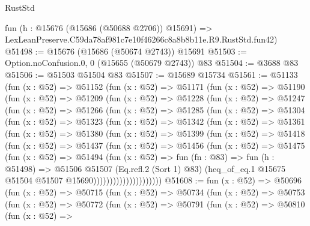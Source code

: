 \begin{lexlean}{RustStd}
\begin{coremodule}
    fun (h : @15676 (@15686 (@50688 @2706)) @15691) =>
    LexLeanPreserve.C59da78af981c7e10f46266c8a8b8b11e.R9.RustStd.fun42)
@51498 := @15676 (@15686 (@50674 @2743)) @15691
@51503 := Option.noConfusion.{0, 0} (@15655 (@50679 @2743)) @83
@51504 := @3688 @83
@51506 := @51503 @51504 @83
@51507 := @15689 @15734
@51561 := @51133
    (fun (x : @52) =>
    @51152
      (fun (x : @52) =>
      @51171
        (fun (x : @52) =>
        @51190
          (fun (x : @52) =>
          @51209
            (fun (x : @52) =>
            @51228
              (fun (x : @52) =>
              @51247
                (fun (x : @52) =>
                @51266
                  (fun (x : @52) =>
                  @51285
                    (fun (x : @52) =>
                    @51304
                      (fun (x : @52) =>
                      @51323
                        (fun (x : @52) =>
                        @51342
                          (fun (x : @52) =>
                          @51361
                            (fun (x : @52) =>
                            @51380
                              (fun (x : @52) =>
                              @51399
                                (fun (x : @52) =>
                                @51418
                                  (fun (x : @52) =>
                                  @51437
                                    (fun (x : @52) =>
                                    @51456
                                      (fun (x : @52) =>
                                      @51475
                                        (fun (x : @52) =>
                                        @51494
                                          (fun (x : @52) =>
                                          fun (fn : @83) =>
                                          fun (h : @51498) =>
                                          @51506
                                            @51507
                                            (Eq.refl.{2} (Sort 1) @83)
                                            (heq_of_eq.{1}
                                              @15675
                                              @51504
                                              @51507
                                              @15690)))))))))))))))))))))
@51608 := fun (x : @52) =>
  @50696
    (fun (x : @52) =>
    @50715
      (fun (x : @52) =>
      @50734
        (fun (x : @52) =>
        @50753
          (fun (x : @52) =>
          @50772
            (fun (x : @52) =>
            @50791
              (fun (x : @52) =>
              @50810
                (fun (x : @52) =>

\end{coremodule}
\end{lexlean}
